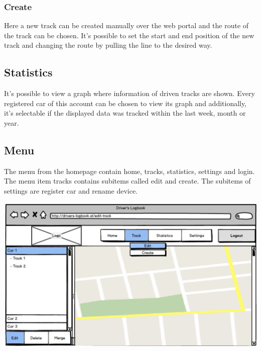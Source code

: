 \subsubsection{Create}
Here a new track can be created manually over the web portal and the route of the track can be chosen. It’s possible to set the start and end position of the new track and changing the route by pulling the line to the desired way.
\subsection{Statistics}
It’s possible to view a graph where information of driven tracks are shown. Every registered car of this account can be chosen to view its graph and additionally, it’s selectable if the displayed data was tracked within the last week, month or year.
\subsection{Menu}
The menu from the homepage contain home, tracks, statistics, settings and login. The menu item tracks contains subitems called edit and create. The subitems of settings are register car and rename device.

\begin{center}
\includegraphics[width=1\textwidth]{bilder/WebPortal}
\end{center}
\clearpageauthor